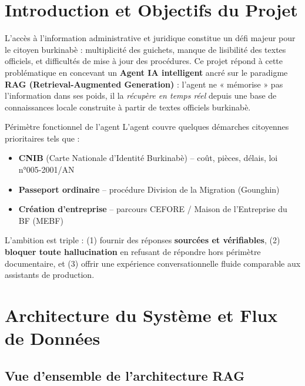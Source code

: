 \documentclass[12pt, a4paper]{article}
\begin{document}
\renewcommand{\contentsname}{Table des matières}
\tableofcontents
\newpage

\section{Introduction et Objectifs du Projet}

L'accès à l'information administrative et juridique constitue un défi majeur pour le citoyen burkinabè : multiplicité des guichets, manque de lisibilité des textes officiels, et difficultés de mise à jour des procédures. Ce projet répond à cette problématique en concevant un \textbf{Agent IA intelligent} ancré sur le paradigme \textbf{RAG (Retrieval-Augmented Generation)} : l'agent ne « mémorise » pas l'information dans ses poids, il la \emph{récupère en temps réel} depuis une base de connaissances locale construite à partir de textes officiels burkinabè.

\begin{infobox}{Périmètre fonctionnel de l'agent}
L'agent couvre quelques démarches citoyennes prioritaires tels que :
\begin{itemize}[noitemsep]
  \item \textbf{CNIB} (Carte Nationale d'Identité Burkinabè) – coût, pièces, délais, loi n°005-2001/AN
  \item \textbf{Passeport ordinaire} – procédure Division de la Migration (Gounghin)
  \item \textbf{Création d'entreprise} – parcours CEFORE / Maison de l'Entreprise du BF (MEBF)
\end{itemize}
\end{infobox}

L'ambition est triple : (1) fournir des réponses \textbf{sourcées et vérifiables}, (2) \textbf{bloquer toute hallucination} en refusant de répondre hors périmètre documentaire, et (3) offrir une expérience conversationnelle fluide comparable aux assistants de production.

\section{Architecture du Système et Flux de Données}

\subsection{Vue d'ensemble de l'architecture RAG}
\end{document}

